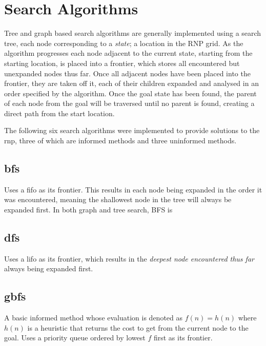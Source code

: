 \section{Search Algorithms} %
\label{sec:search_algorithms}
Tree and graph based search algorithms are generally implemented using a search \gls{tree}, each node corresponding to a \textit{state}; a location in the RNP grid. As the algorithm progresses each node adjacent to the current state, starting from the starting location, is placed into a \Gls{frontier}, which stores all encountered but unexpanded nodes thus far. Once all adjacent nodes have been placed into the frontier, they are taken off it, each of their children expanded and analysed in an order specified by the algorithm. Once the goal state has been found, the parent of each node from the goal will be traversed until no parent is found, creating a direct path from the start location.
\par
The following six search algorithms were implemented to provide solutions to the \gls{rnp}, three of which are \gls{informed} methods and three \gls{uninformed} methods.

\subsection{\texorpdfstring{\acrfull{bfs}}{BFS}} %
\label{sub:bfs}
Uses a \acrfull{fifo} as its frontier. This results in each node being expanded in the order it was encountered, meaning the shallowest node in the tree will always be expanded first. In both graph and tree search, BFS is 

\subsection{\texorpdfstring{\acrfull{dfs}}{DFS}} %
\label{sub:dfs}
Uses a \acrfull{lifo} as its frontier, which results in the \textit{deepest node encountered thus far} always being expanded first.

\subsection{\texorpdfstring{\acrfull{gbfs}}{GBFS}} %
\label{sub:gbfs}
A basic \gls{informed} method whose \gls{evaluation} is denoted as $f(n)=h(n)$ where $h(n)$ is a \gls{heuristic} that returns the cost to get from the current node to the goal. Uses a priority queue ordered by lowest $f$ first as its frontier.

